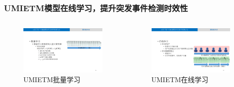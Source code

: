 \begin{frame}
\frametitle{UMIETM模型在线学习，提升突发事件检测时效性}
\vspace{-6mm}
\begin{columns}
\begin{column}{0.48\paperwidth}
	\begin{figure}
		\setlength{\abovecaptionskip}{0.cm}
		\setlength{\belowcaptionskip}{0.cm}
		\caption{UMIETM批量学习}
		\includegraphics[width=\textwidth]{img/UMIETM/batch_learning.pdf}
	\end{figure}
\end{column}

\begin{column}{0.48\paperwidth}
	\begin{figure}
		\setlength{\abovecaptionskip}{0.cm}
		\setlength{\belowcaptionskip}{0.cm}
		\caption{UMIETM在线学习}
		\includegraphics[width=\textwidth]{img/UMIETM/online_learning.pdf}
	\end{figure}
\end{column}	
\end{columns}


\end{frame}
